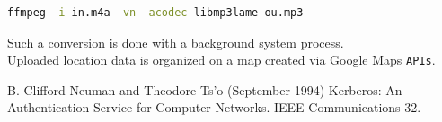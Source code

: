 \documentclass[conference]{IEEEtran}
\begin{document}
\begin{lstlisting}[language=Bash, caption=FFMPEG command to convert aac to mp3]
ffmpeg -i in.m4a -vn -acodec libmp3lame ou.mp3
\end{lstlisting}

Such a conversion is done with a background system process.\\

Uploaded location data is organized on a map created via Google Maps \texttt{APIs}.



\begin{thebibliography}{1}

\bibitem{}
B. Clifford Neuman and Theodore Ts'o (September 1994) Kerberos: An Authentication Service for Computer Networks.  IEEE Communications 32. \\

\end{thebibliography}

\end{document}
